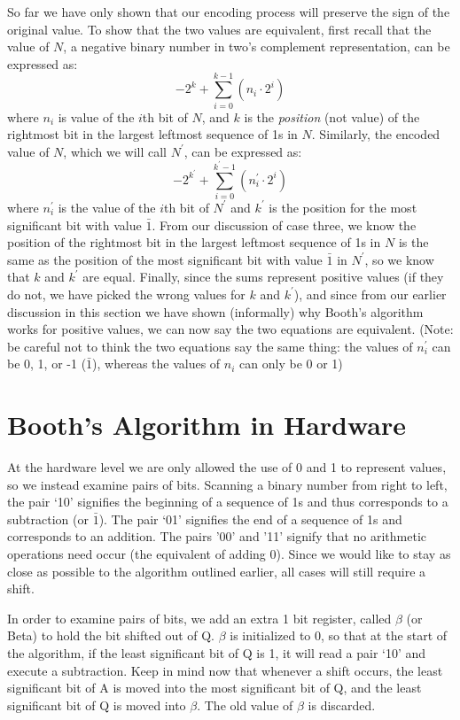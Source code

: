 \documentclass{article}
\begin{document}
So far we have only shown that our encoding process will preserve the sign of the original value.
To show that the two values are equivalent, first recall that the value of $N$, a negative binary number in two's complement representation, can be expressed as:
\[-2^k + \sum_{i=0}^{k-1} (n_i \cdot 2^i)\]
where $n_i$ is value of the $i$th bit of $N$, and $k$ is the \emph{position} (not value) of the rightmost bit in the largest leftmost sequence of 1s in $N$.
Similarly, the encoded value of $N$, which we will call $N^{\prime}$, can be expressed as:
\[-2^{k^{\prime}} + \sum_{i=0}^{k^{\prime}-1} (n_i^{\prime} \cdot 2^i)\]
where $n_i^{\prime}$ is the value of the $i$th bit of $N^{\prime}$ and $k^{\prime}$ is the position for the most significant bit with value $\bar{1}$.
From our discussion of case three, we know the position of the rightmost bit in the largest leftmost sequence of 1s in $N$ is the same as the position of the most significant bit with value $\bar{1}$ in $N^{\prime}$, so we know that $k$ and $k^{\prime}$ are equal.
Finally, since the sums represent positive values (if they do not, we have picked the wrong values for $k$ and $k^{\prime}$), and since from our earlier discussion in this section we have shown (informally) why Booth's algorithm works for positive values, we can now say the two equations are equivalent.
(Note: be careful not to think the two equations say the same thing: the values of $n_i^{\prime}$ can be 0, 1, or -1 ($\bar{1}$), whereas the values of $n_i$ can only be 0 or 1)

\section{Booth's Algorithm in Hardware}
    At the hardware level we are only allowed the use of 0 and 1 to represent values, so we instead examine pairs of bits.
Scanning a binary number from right to left, the pair `10' signifies the beginning of a sequence of 1s and thus corresponds to a subtraction (or $\bar{1}$).
The pair `01' signifies the end of a sequence of 1s and corresponds to an addition.
The pairs '00' and '11' signify that no arithmetic operations need occur (the equivalent of adding 0).
Since we would like to stay as close as possible to the algorithm outlined earlier, all cases will still require a shift.

    In order to examine pairs of bits, we add an extra 1 bit register, called $\beta$ (or Beta) to hold the bit shifted out of Q.
$\beta$ is initialized to 0, so that at the start of the algorithm, if the least significant bit of Q is 1, it will read a pair `10' and execute a subtraction.
Keep in mind now that whenever a shift occurs, the least significant bit of A is moved into the most significant bit of Q, and the least significant bit of Q is moved into $\beta$.
The old value of $\beta$ is discarded.
\end{document}
